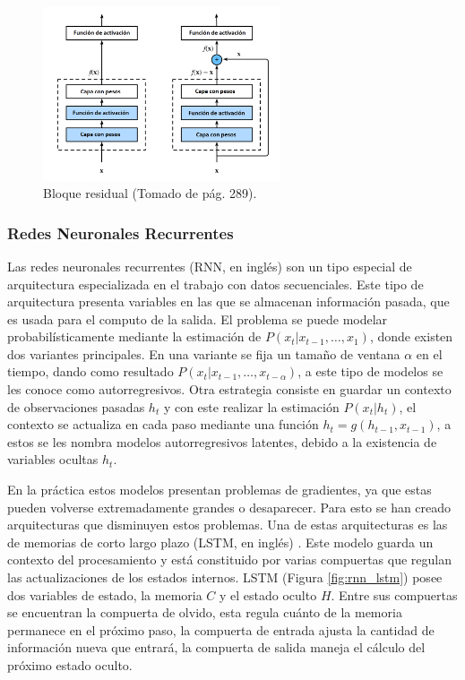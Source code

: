 \documentclass[a4paper,11pt,twocolumn,twoside]{article}
\begin{document}
\begin{figure}[h]
    \centering
	\includegraphics[width=7cm,clip]{Graphics/resnet.png}
	\caption{Bloque residual (Tomado de \cite{d2l} pág. 289).}
	\label{fig:res_block}
\end{figure}

\subsubsection{Redes Neuronales Recurrentes}

Las redes neuronales recurrentes (RNN, en inglés) son
un tipo especial de arquitectura especializada en el trabajo con datos secuenciales. Este tipo de arquitectura
presenta variables en las que se almacenan información pasada, que es usada para el computo de la salida. El 
problema se puede modelar probabilísticamente mediante la estimación de $P(x_t | x_{t-1}, \dots, x_{1})$,
donde existen dos variantes principales. En una variante se fija un tamaño de ventana $\alpha$ en el tiempo, 
dando como resultado $P(x_t | x_{t-1}, \dots, x_{t-\alpha})$, a este tipo de modelos se les conoce como autorregresivos. 
Otra estrategia consiste en guardar un contexto de observaciones pasadas $h_t$ y con este realizar la estimación 
$P(x_t | h_t)$, el contexto se actualiza en cada paso mediante una función $h_t = g(h_{t-1}, x_{t-1})$, a estos 
se les nombra modelos autorregresivos latentes, debido a la existencia de variables ocultas $h_t$. 

En la práctica estos modelos presentan problemas de gradientes, ya que estas pueden volverse extremadamente grandes o 
desaparecer.
Para esto se han creado arquitecturas que disminuyen estos problemas. Una de estas arquitecturas es las de memorias
de corto largo plazo (LSTM, en inglés) \cite{hochreiter1997long}.
Este modelo guarda un contexto del procesamiento y está constituido por varias compuertas que regulan las 
actualizaciones de los estados internos. LSTM (Figura \ref{fig:rnn_lstm}) posee dos variables de estado, la memoria 
$C$ y el estado oculto $H$. Entre sus compuertas se encuentran la compuerta de olvido, esta regula cuánto de la 
memoria permanece en el próximo paso, la compuerta de entrada ajusta la cantidad de información nueva que entrará, 
la compuerta de salida maneja el cálculo del próximo estado oculto.
\end{document}
